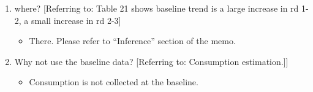 \begin{itemize}
\begin{enumerate}
\begin{itemize}
	\end{itemize}
\item	where? [Referring to: Table 21 shows baseline trend is a large increase in rd 1-2, a small increase in rd 2-3]
	\begin{itemize}
	\vspace{1.0ex}\setlength{\itemsep}{1.0ex}\setlength{\baselineskip}{12pt}
	\item	There. Please refer to ``Inference'' section of the memo. 
	\end{itemize}
\item	Why not use the baseline data? [Referring to: Consumption estimation.]]
	\begin{itemize}
	\vspace{1.0ex}\setlength{\itemsep}{1.0ex}\setlength{\baselineskip}{12pt}
	\item	Consumption is not collected at the baseline.
	\end{itemize}
\end{enumerate}
\end{itemize}

\vspace{2ex}

